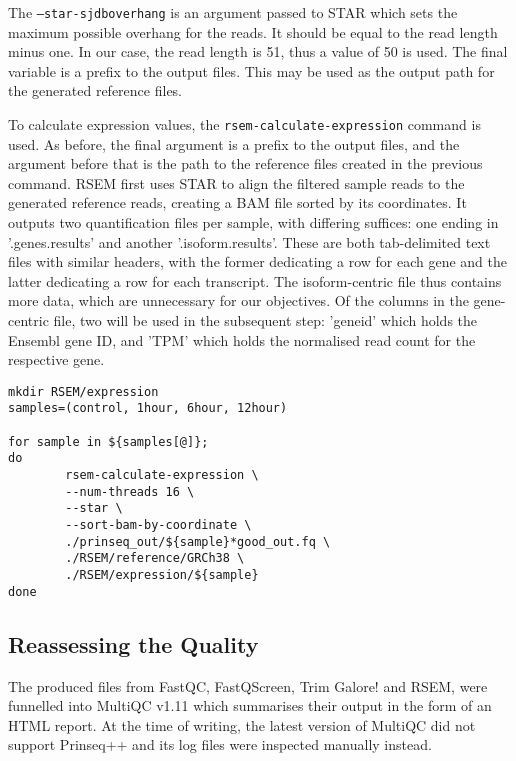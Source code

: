 The \texttt{--star-sjdboverhang} is an argument passed to \ac{STAR} which sets the maximum possible overhang for the reads. It should be equal to the read length minus one. In our case, the read length is 51, thus a value of 50 is used. The final variable is a prefix to the output files. This may be used as the output path for the generated reference files.

To calculate expression values, the \texttt{rsem-calculate-expression} command is used. As before, the final argument is a prefix to the output files, and the argument before that is the path to the reference files created in the previous command. RSEM first uses \ac{STAR} to align the filtered sample reads to the generated reference reads, creating a BAM file sorted by its coordinates. It outputs two quantification files per sample, with differing suffices: one ending in '.genes.results' and another '.isoform.results'. These are both tab-delimited text files with similar headers, with the former dedicating a row for each gene and the latter dedicating a row for each transcript. The isoform-centric file thus contains more data, which are unnecessary for our objectives. Of the columns in the gene-centric file, two will be used in the subsequent step: 'gene\textunderscore id' which holds the Ensembl gene ID, and 'TPM' which holds the normalised read count for the respective gene.

\begin{lstlisting}[caption=RSEM expression command, label={lst:RSEM_exp}]
mkdir RSEM/expression
samples=(control, 1hour, 6hour, 12hour)

for sample in ${samples[@]};
do
        rsem-calculate-expression \
        --num-threads 16 \
        --star \
        --sort-bam-by-coordinate \
        ./prinseq_out/${sample}*good_out.fq \
        ./RSEM/reference/GRCh38 \
        ./RSEM/expression/${sample}
done
\end{lstlisting}

\subsection{Reassessing the Quality}

The produced files from FastQC, FastQScreen, Trim Galore! and RSEM, were funnelled into MultiQC v1.11 \citep{multiqc} which summarises their output in the form of an HTML report. At the time of writing, the latest version of MultiQC did not support Prinseq++ and its log files were inspected manually instead.

